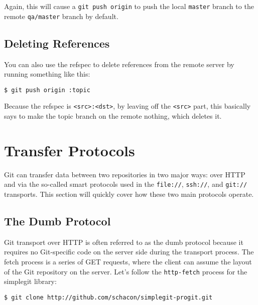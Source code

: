 \documentclass[a4paper]{book}
\begin{document}
Again, this will cause a \texttt{git push origin} to push the local \texttt{master} branch to the remote \texttt{qa/master} branch by default.

\subsection{Deleting References}

You can also use the refspec to delete references from the remote server by running something like this:

\begin{shaded}\begin{verbatim}
$ git push origin :topic
\end{verbatim}\end{shaded}

Because the refspec is \texttt{\textless{}src\textgreater{}:\textless{}dst\textgreater{}}, by leaving off the \texttt{\textless{}src\textgreater{}} part, this basically says to make the topic branch on the remote nothing, which deletes it.

\section{Transfer Protocols}

Git can transfer data between two repositories in two major ways: over HTTP and via the so-called smart protocols used in the \texttt{file://}, \texttt{ssh://}, and \texttt{git://} transports. This section will quickly cover how these two main protocols operate.

\subsection{The Dumb Protocol}

Git transport over HTTP is often referred to as the dumb protocol because it requires no Git-specific code on the server side during the transport process. The fetch process is a series of GET requests, where the client can assume the layout of the Git repository on the server. Let's follow the \texttt{http-fetch} process for the simplegit library:

\begin{shaded}\begin{verbatim}
$ git clone http://github.com/schacon/simplegit-progit.git
\end{verbatim}\end{shaded}
\end{document}
